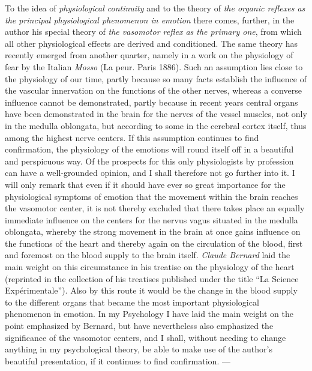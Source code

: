 \documentclass[12pt,a4paper,openany]{book}
\newcommand{\opage}[1]{\marginnote{\footnotesize\textit{[#1]}}}
\begin{document}
To the idea of \emph{physiological continuity} and to the theory
of \emph{the organic reflexes as the principal physiological phenomenon
in emotion} there comes, further, in the author his special
theory of \emph{the vasomotor reflex as the primary one}, from
which all other physiological effects are derived and
conditioned. The same theory has recently emerged from another
quarter, namely in a work on the physiology of fear by the Italian
\emph{Mosso} (La peur. Paris 1886). Such an assumption lies close to
the physiology of our time, partly because so many facts
establish the influence of the vascular innervation on the functions of the other nerves,
whereas a converse influence cannot be demonstrated,
partly because in recent years central organs have been demonstrated
in the brain for the nerves of the vessel muscles, not only in the medulla oblongata,
but according to some in the cerebral cortex itself,
thus among the highest nerve centers. If this
assumption continues to find confirmation, the physiology of the emotions
will round itself off in a beautiful and perspicuous way.
Of the prospects for this only physiologists by
profession can have a well-grounded opinion, and I shall therefore not
go further into it. I will only remark that even if it
should have ever so great importance for the physiological symptoms of emotion
that the movement within the brain reaches
the vasomotor center, it is not thereby
excluded that there takes place an equally immediate influence on
the centers for the nervus vagus situated in the medulla oblongata,
whereby the strong movement in the brain at once gains
influence on the functions of the heart and thereby again on the
\opage{59}circulation of the blood, first and foremost on the blood supply to the
brain itself. \emph{Claude Bernard} laid the main weight on this
circumstance in his treatise on the physiology of the heart (reprinted
in the collection of his treatises published under the title
``La Science Expérimentale''). Also by this route
it would be the change in the blood supply to the different
organs that became the most important physiological phenomenon in
emotion. In my Psychology I have laid the main weight
on the point emphasized by Bernard, but have nevertheless also
emphasized the significance of the vasomotor centers, and I shall,
without needing to change anything in my psychological theory,
be able to make use of the author's beautiful presentation, if it
continues to find confirmation. ---
\end{document}
